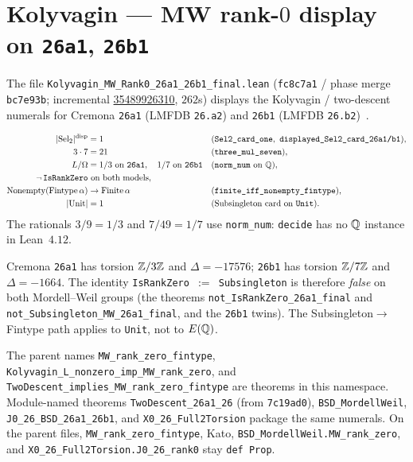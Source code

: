 \section{Kolyvagin --- MW rank-$0$ display on \texttt{26a1}, \texttt{26b1}}
\label{sec:kolyvagin}

The file
\texttt{Kolyvagin\_MW\_Rank0\_26a1\_26b1\_final.lean}
(\texttt{fc8c7a1} / phase merge \texttt{bc7e93b}; incremental
\href{https://github.com/DavidFox998/beal-level-26-foundations/actions/runs/35489926310}{35489926310},
$262$s) displays the Kolyvagin / two-descent numerals for Cremona
\texttt{26a1} (LMFDB \texttt{26.a2}) and \texttt{26b1} (LMFDB
\texttt{26.b2})~\cite{kolyvagin1990,cremona,lmfdb}.

\begin{displaythm}
\label{disp:kolyvagin}
\[
\begin{aligned}
  \lvert\Sel_2\rvert^{\mathrm{disp}}&=1
    &&(\texttt{Sel2\_card\_one},\ \texttt{displayed\_Sel2\_card\_26a1/b1}),\\
  3\cdot 7&=21
    &&(\texttt{three\_mul\_seven}),\\
  L/\cO&=1/3\text{ on \texttt{26a1}},\quad
  1/7\text{ on \texttt{26b1}}
    &&(\texttt{norm\_num}\text{ on }\Q),\\
  \neg\,\mathtt{IsRankZero}&
    \text{ on both models},\\
  \mathrm{Nonempty}(\mathrm{Fintype}\,\alpha)&\to\mathrm{Finite}\,\alpha
    &&(\texttt{finite\_iff\_nonempty\_fintype}),\\
  \lvert\mathrm{Unit}\rvert&=1
    &&(\text{Subsingleton card on }\mathtt{Unit}).
\end{aligned}
\]
The rationals $3/9=1/3$ and $7/49=1/7$ use \texttt{norm\_num}:
\texttt{decide} has no $\mathbb{Q}$ instance in Lean~$4.12$.
\end{displaythm}

Cremona \texttt{26a1} has torsion $\mathbb{Z}/3\mathbb{Z}$ and $\Delta=-17576$;
\texttt{26b1} has torsion $\mathbb{Z}/7\mathbb{Z}$ and $\Delta=-1664$. The identity
\texttt{IsRankZero $:=$ Subsingleton} is therefore \emph{false} on
both Mordell--Weil groups (the theorems
\texttt{not\_IsRankZero\_26a1\_final} and
\texttt{not\_Subsingleton\_MW\_26a1\_final}, and the \texttt{26b1}
twins). The Subsingleton$\to$Fintype path applies to
\texttt{Unit}, not to $E(\mathbb{Q})$.

The parent names \texttt{MW\_rank\_zero\_fintype},
\texttt{Kolyvagin\_L\_nonzero\_imp\_MW\_rank\_zero}, and
\texttt{TwoDescent\_implies\_MW\_rank\_zero\_fintype} are theorems
in this namespace. Module-named theorems
\texttt{TwoDescent\_26a1\_26} (from \texttt{7c19ad0}),
\texttt{BSD\_MordellWeil}, \texttt{J0\_26\_BSD\_26a1\_26b1}, and
\texttt{X0\_26\_Full2Torsion} package the same numerals. On the
parent files, \texttt{MW\_rank\_zero\_fintype}, Kato,
\texttt{BSD\_MordellWeil.MW\_rank\_zero}, and
\texttt{X0\_26\_Full2Torsion.J0\_26\_rank0} stay \texttt{def Prop}.

